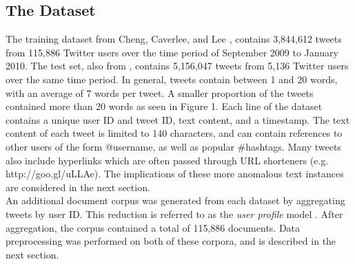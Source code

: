 \documentclass{acm_proc_article-sp}
\begin{document}
\subsection{The Dataset}
\hspace*{5mm}The training dataset from Cheng, Caverlee, and Lee \cite{cheng2010content}, contains 3,844,612 tweets from 115,886 Twitter users over the time period of September 2009 to January 2010. The test set, also from \cite{cheng2010content}, contains 5,156,047 tweets from 5,136 Twitter users over the same time period. In general, tweets contain between 1 and 20 words, with an average of 7 words per tweet. A smaller proportion of the tweets contained more than 20 words as seen in Figure 1. Each line of the dataset contains a unique user ID and tweet ID, text content, and a timestamp. The text content of each tweet is limited to 140 characters, and can contain references to other users of the form @username, as well as popular \#hashtags. Many tweets also include hyperlinks which are often passed through URL shorteners (e.g. http://goo.gl/uLLAe). The implications of these more anomalous text instances are considered in the next section.\\
\hspace*{5mm}An additional document corpus was generated from each dataset by aggregating tweets by user ID. This reduction is referred to as the \textit{user profile} model \cite{hong2010empirical}. After aggregation, the corpus contained a total of 115,886 documents. Data preprocessing was performed on both of these corpora, and is described in the next section.
\end{document}
